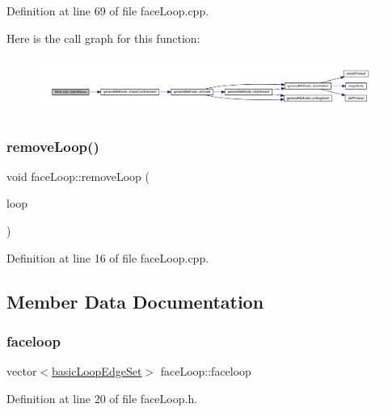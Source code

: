 Definition at line 69 of file face\+Loop.\+cpp.

Here is the call graph for this function\+:
\nopagebreak
\begin{figure}[H]
\begin{center}
\leavevmode
\includegraphics[width=350pt]{classface_loop_a603c5cfde9765657af9cf088df8fc474_cgraph}
\end{center}
\end{figure}
\mbox{\label{classface_loop_ac1c63792b00865fc45ad8934b5580e62}} 
\subsubsection{\texorpdfstring{remove\+Loop()}{removeLoop()}}
{\footnotesize\ttfamily void face\+Loop\+::remove\+Loop (\begin{DoxyParamCaption}\item[{\mbox{\hyperlink{classbasic_loop_edge_set}{basic\+Loop\+Edge\+Set}}}]{loop }\end{DoxyParamCaption})}



Definition at line 16 of file face\+Loop.\+cpp.



\subsection{Member Data Documentation}
\mbox{\label{classface_loop_a3f032bc5496c429abc4723632d29ceaf}} 
\subsubsection{\texorpdfstring{faceloop}{faceloop}}
{\footnotesize\ttfamily vector$<$\mbox{\hyperlink{classbasic_loop_edge_set}{basic\+Loop\+Edge\+Set}}$>$ face\+Loop\+::faceloop}



Definition at line 20 of file face\+Loop.\+h.

